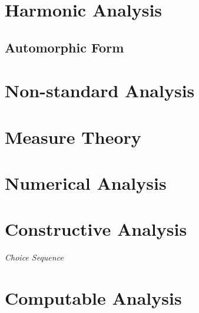 \section{Harmonic Analysis}\label{sec:harmonic_analysis}

\subsection{Automorphic Form}\label{sec:automorphic_form}



\section{Non-standard Analysis}\label{sec:nonstandard_analysis}

\section{Measure Theory}\label{sec:measure_theory}

\section{Numerical Analysis}\label{sec:numerical_analysis}

\section{Constructive Analysis}\label{sec:constructive_analysis}

\emph{Choice Sequence}

\section{Computable Analysis}\label{sec:computable_analysis}


